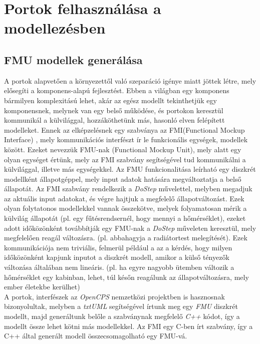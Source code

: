 \documentclass[a4paper,12pt]{report}
\begin{document}
\chapter{Portok felhasználása a modellezésben}

\section{FMU modellek generálása}
A portok alapvetően a környezettől való szeparáció igénye miatt jöttek létre, mely elősegíti a komponens-alapú fejlesztést. Ebben a világban egy komponens bármilyen komplexitású lehet, akár az egész modellt tekinthetjük egy komponensnek, melynek van egy belső működése, és portokon keresztül kommunikál a külvilággal, hozzáköthetünk más, hasonló elven felépített modelleket. Ennek az elképzelésnek egy szabványa az FMI(Functional Mockup Interface) \cite{fmi_standard}, mely kommunikációs interfészt ír le funkcionális egységek, modellek között. Ezeket nevezzük FMU-nak (Functional Mockup Unit), mely alatt egy olyan egységet értünk, mely az FMI  szabvány segítségével tud kommunikálni a külvilággal, illetve más egységekkel. Az FMU funkcionalitása leírható egy diszkrét modellként állapotgéppel, mely input adatok hatására megváltoztatja a belső állapotát. Az FMI szabvány rendelkezik a \textit{DoStep} művelettel, melyben megadjuk az aktuális input adatokat, és végre hajtjuk a megfelelő állapotváltozást. Ezek olyan folytatonos modellekkel vannak összekötve, melyek folyamatosan mérik a külvilág állapotát (pl. egy fűtésrendsernél, hogy mennyi a hőmérséklet), ezeket adott időközönként továbbítják egy FMU-nak a \textit{DoStep} műveleten keresztül, mely megfelelően reagál változásra. (pl. abbahagyja a radiátortest melegítését). Ezek kommunikációja nem triviális, felmerül például a az a kérdés, hogy milyen időközönként kapjunk inputot a diszkrét modell, amikor a külső tényezők változása általában nem lineáris. (pl. ha egyre nagyobb ütemben változik a hőmérséklet egy kabinban, lehet, túl későn reagálunk az állapotváltozásra, mely ember életekbe kerülhet) \\ A portok, interfészek az \textit{OpenCPS}\cite{opencps} nemzetközi projektben is hasznosnak bizonyolultak, melyben a \textit{txtUML} segítségével írtunk meg egy \textit{FMU} diszkrét modellt, majd generáltunk belőle a szabványnak megfelelő \textit{C++} kódot, így a modellt össze lehet kötni más modellekkel. Az FMI egy C-ben írt szabvány, így a C++ által generált modell összecsomagolható egy FMU-vá. \cite{fmu_export} \\
\end{document}
